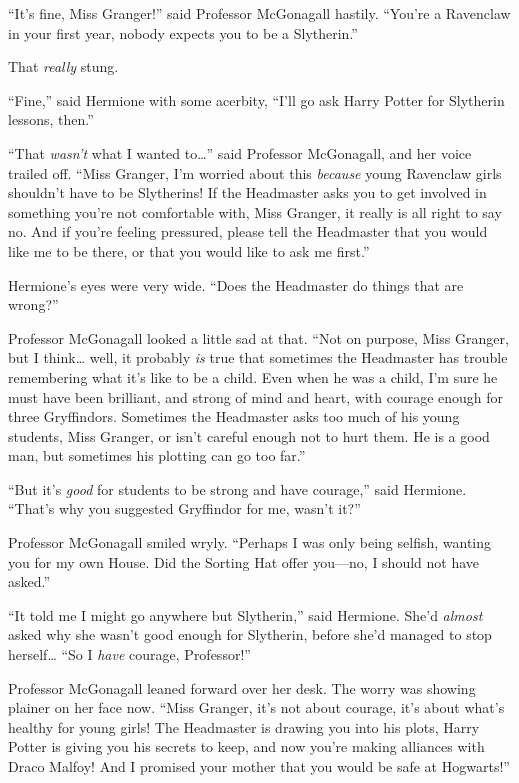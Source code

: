 ``It's fine, Miss Granger!'' said Professor McGonagall hastily. ``You're
a Ravenclaw in your first year, nobody expects you to be a Slytherin.''

That \emph{really} stung.

``Fine,'' said Hermione with some acerbity, ``I'll go ask Harry Potter
for Slytherin lessons, then.''

``That \emph{wasn't} what I wanted to\ldots{}'' said Professor
McGonagall, and her voice trailed off. ``Miss Granger, I'm worried about
this \emph{because} young Ravenclaw girls shouldn't have to be
Slytherins! If the Headmaster asks you to get involved in something
you're not comfortable with, Miss Granger, it really is all right to say
no. And if you're feeling pressured, please tell the Headmaster that you
would like me to be there, or that you would like to ask me first.''

Hermione's eyes were very wide. ``Does the Headmaster do things that are
wrong?''

Professor McGonagall looked a little sad at that. ``Not on purpose, Miss
Granger, but I think\ldots{} well, it probably \emph{is} true that
sometimes the Headmaster has trouble remembering what it's like to be a
child. Even when he was a child, I'm sure he must have been brilliant,
and strong of mind and heart, with courage enough for three Gryffindors.
Sometimes the Headmaster asks too much of his young students, Miss
Granger, or isn't careful enough not to hurt them. He is a good man, but
sometimes his plotting can go too far.''

``But it's \emph{good} for students to be strong and have courage,''
said Hermione. ``That's why you suggested Gryffindor for me, wasn't
it?''

Professor McGonagall smiled wryly. ``Perhaps I was only being selfish,
wanting you for my own House. Did the Sorting Hat offer you---no, I
should not have asked.''

``It told me I might go anywhere but Slytherin,'' said Hermione. She'd
\emph{almost} asked why she wasn't good enough for Slytherin, before
she'd managed to stop herself\ldots{} ``So I \emph{have} courage,
Professor!''

Professor McGonagall leaned forward over her desk. The worry was showing
plainer on her face now. ``Miss Granger, it's not about courage, it's
about what's healthy for young girls! The Headmaster is drawing you into
his plots, Harry Potter is giving you his secrets to keep, and now
you're making alliances with Draco Malfoy! And I promised your mother
that you would be safe at Hogwarts!''

